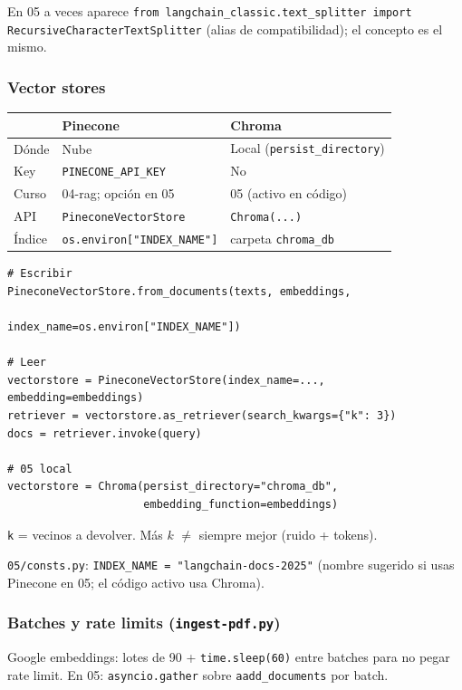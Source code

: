 \documentclass[11pt,a4paper]{article}
\begin{document}
En 05 a veces aparece \texttt{from langchain\_classic.text\_splitter import RecursiveCharacterTextSplitter}
(alias de compatibilidad); el concepto es el mismo.

\subsubsection{Vector stores}
\begin{center}
\begin{tabular}{@{}llp{6.6cm}@{}}
\toprule
 & \textbf{Pinecone} & \textbf{Chroma} \\
\midrule
Dónde & Nube & Local (\texttt{persist\_directory}) \\
Key & \texttt{PINECONE\_API\_KEY} & No \\
Curso & 04-rag; opción en 05 & 05 (activo en código) \\
API & \texttt{PineconeVectorStore} & \texttt{Chroma(...)} \\
Índice & \texttt{os.environ["INDEX\_NAME"]} & carpeta \texttt{chroma\_db} \\
\bottomrule
\end{tabular}
\end{center}

\begin{lstlisting}
# Escribir
PineconeVectorStore.from_documents(texts, embeddings,
                                   index_name=os.environ["INDEX_NAME"])

# Leer
vectorstore = PineconeVectorStore(index_name=..., embedding=embeddings)
retriever = vectorstore.as_retriever(search_kwargs={"k": 3})
docs = retriever.invoke(query)

# 05 local
vectorstore = Chroma(persist_directory="chroma_db",
                     embedding_function=embeddings)
\end{lstlisting}

\texttt{k} = vecinos a devolver. Más $k$ $\neq$ siempre mejor (ruido + tokens).

\texttt{05/consts.py}: \texttt{INDEX\_NAME = "langchain-docs-2025"} (nombre sugerido si usas Pinecone en 05; el código activo usa Chroma).

\subsubsection{Batches y rate limits (\texttt{ingest-pdf.py})}
Google embeddings: lotes de 90 + \texttt{time.sleep(60)} entre batches para no pegar rate limit.
En 05: \texttt{asyncio.gather} sobre \texttt{aadd\_documents} por batch.
\end{document}
